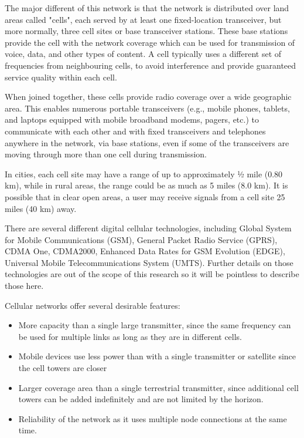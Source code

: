 \vspace{12pt}

The major different of this network is that the network is distributed over land areas called "cells", each served by at least one fixed-location transceiver, but more normally, three cell sites or base transceiver stations. These base stations provide the cell with the network coverage which can be used for transmission of voice, data, and other types of content. A cell typically uses a different set of frequencies from neighbouring cells, to avoid interference and provide guaranteed service quality within each cell.\cite{patent}

\vspace{12pt}


When joined together, these cells provide radio coverage over a wide geographic area. This enables numerous portable transceivers (e.g., mobile phones, tablets, and laptops equipped with mobile broadband modems, pagers, etc.) to communicate with each other and with fixed transceivers and telephones anywhere in the network, via base stations, even if some of the transceivers are moving through more than one cell during transmission.


\vspace{12pt}

In cities, each cell site may have a range of up to approximately 1⁄2 mile (0.80 km), while in rural areas, the range could be as much as 5 miles (8.0 km). It is possible that in clear open areas, a user may receive signals from a cell site 25 miles (40 km) away.

\vspace{12pt}
There are several different digital cellular technologies, including Global System for Mobile Communications (GSM), General Packet Radio Service (GPRS), CDMA One, CDMA2000, Enhanced Data Rates for GSM Evolution (EDGE), Universal Mobile Telecommunications System (UMTS). Further details on those technologies are out of the scope of this research so it will be pointless to describe those here.

\vspace{12pt}

Cellular networks offer several desirable features:

\vspace{12pt}

\begin{itemize}
  \item More capacity than a single large transmitter, since the same frequency can be used for multiple links as long as they are in different cells.
  \item Mobile devices use less power than with a single transmitter or satellite since the cell towers are closer
  \item Larger coverage area than a single terrestrial transmitter, since additional cell towers can be added indefinitely and are not limited by the horizon.
  \item Reliability of the network as it uses multiple node connections at the same time.
\end{itemize}

